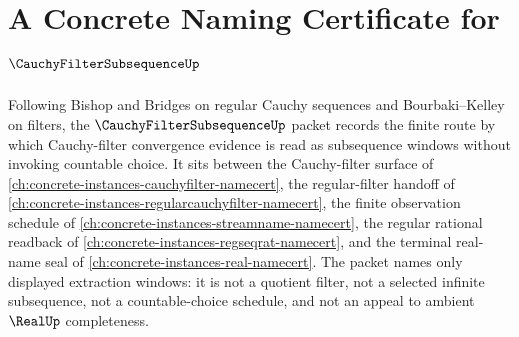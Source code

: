 \chapter{A Concrete Naming Certificate for $\CauchyFilterSubsequenceUp$}
\label{ch:concrete-instances-cauchy-filter-subsequence-namecert}

Following Bishop and Bridges on regular Cauchy sequences and Bourbaki--Kelley on filters, the $\CauchyFilterSubsequenceUp$ packet records the finite route by which Cauchy-filter convergence evidence is read as subsequence windows without invoking countable choice. It sits between the Cauchy-filter surface of \autoref{ch:concrete-instances-cauchyfilter-namecert}, the regular-filter handoff of \autoref{ch:concrete-instances-regularcauchyfilter-namecert}, the finite observation schedule of \autoref{ch:concrete-instances-streamname-namecert}, the regular rational readback of \autoref{ch:concrete-instances-regseqrat-namecert}, and the terminal real-name seal of \autoref{ch:concrete-instances-real-namecert}. The packet names only displayed extraction windows: it is not a quotient filter, not a selected infinite subsequence, not a countable-choice schedule, and not an appeal to ambient $\RealUp$ completeness.

